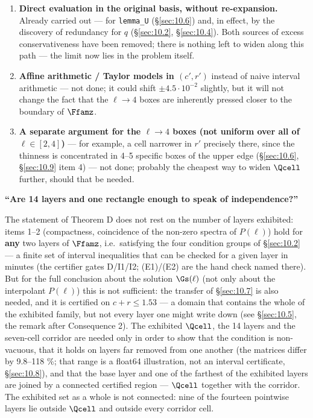 \begin{enumerate}
\item \textbf{Direct evaluation in the original basis, without re-expansion.} Already
   carried out --- for \texttt{lemma\_U} (\S\ref{sec:10.6}) and, in effect, by the discovery of
   redundancy for $q$ (\S\ref{sec:10.2}, \S\ref{sec:10.4}). Both sources of excess conservativeness
   have been removed; there is nothing left to widen along this path ---
   the limit now lies in the problem itself.

\item \textbf{Affine arithmetic / Taylor models in $(c', r')$} instead of naive
   interval arithmetic --- not done; it could shift $\pm 4.5\cdot 10^{-2}$ slightly, but
   it will not change the fact that the $\ell \to 4$ boxes are inherently pressed
   closer to the boundary of $\Ffamz$.

\item \textbf{A separate argument for the $\ell \to 4$ boxes (not uniform over all of
   $\ell \in [2,4]$)} --- for example, a cell narrower in $r'$ precisely there, since
   the thinness is concentrated in 4--5 specific boxes of the upper edge (\S\ref{sec:10.6},
   \S\ref{sec:10.9} item 4) --- not done; probably the cheapest way to widen $\Qcell$ further,
   should that be needed.
\end{enumerate}

\textbf{``Are 14 layers and one rectangle enough to speak of
independence?''}

The statement of Theorem D does not rest on the number of layers exhibited:
items 1--2 (compactness, coincidence of the non-zero spectra of $P(\ell)$) hold
for \textbf{any} two layers of $\Ffamz$, i.e.\ satisfying the four condition groups of \S\ref{sec:10.2} --- a finite set of
interval inequalities that can be checked for a given layer in minutes (the certifier
gates D/I1/I2; (E1)/(E2) are the hand check named there). But
for the full conclusion about the solution $\Gs(\ell)$ (not only about the
interpolant $P(\ell)$) this is not sufficient: the transfer of \S\ref{sec:10.7} is also
needed, and it is certified on $c+r\leq 1.53$ --- a domain that contains the whole of the
exhibited family, but not every layer one might write down (see \S\ref{sec:10.5}, the remark after
Consequence 2).
The exhibited $\Qcell$, the 14 layers and the seven-cell corridor are needed
only in order to show that the condition is non-vacuous, that it holds on layers
far removed from one another (the matrices differ by 9.8--118 \%; that range is a
float64 illustration, not an interval certificate, \S\ref{sec:10.8}), and that the
base layer and one of the farthest of the exhibited layers are joined by a connected
certified region --- $\Qcell$ together with the corridor. The exhibited set as a
whole is not connected: nine of the fourteen pointwise layers lie outside
$\Qcell$ and outside every corridor cell.

